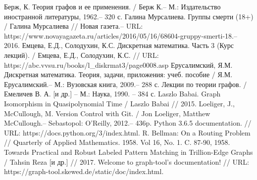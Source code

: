 

\begin{thebibliography}{}
	  Берж, К. Теория графов и ее применения. / Берж К.-- М.: Издательство иностранной литературы, 1962.-- 320 с.
	  Галина Мурсалиева. Группы смерти (18+) / Галина Мурсалиева // Новая газета.-- URL: https://www.novayagazeta.ru/articles/2016/05/16/68604-gruppy-smerti-18.-- 2016.
	  Емцева, Е.Д., Солодухин, К.С. Дискретная математика. Часть 3 (Курс лекций). / Емцева, Е.Д., Солодухин, К.С. // URL: https://abc.vvsu.ru/books/l\_diskrmat3/page0008.asp
	  Ерусалимский, Я.М. Дискретная математика. Теория, задачи, приложения: учеб. пособие / Я.М. Ерусалимский.-- М.: Вузовская книга, 2009.-- 288 с.
	 Лекции по теории графов. / Емеличев В. А. [и др.] -- М.: Наука, 1990. -- 384 с.	
	  Laszlo Babai. Graph Isomorphism in Quasipolynomial Time / Laszlo Babai // 2015.
	 Loeliger, J., McCullough, M. Version Control with Git. / Jon Loeliger, Matthew McCullough.-- Sebastopol: O'Reilly, 2012.-- 436p.
	 Python 3.6.5 documentation. // URL: https://docs.python.org/3/index.html.
	 R. Bellman: On a Routing Problem // Quarterly of Applied Mathematics. 1958. Vol 16, No. 1. C. 87-90, 1958.
	  Towards Practical and Robust Labeled Pattern Matching in Trillion-Edge Graphs / Tahsin Reza [и др.] // 2017.
	 Welcome to graph-tool’s documentation! // URL: https://graph-tool.skewed.de/static/doc/index.html.
\end{thebibliography}
